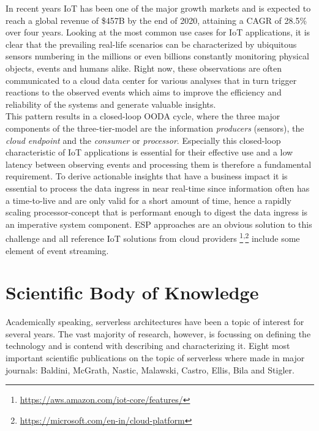 In recent years \acf{IoT} has been one of the major growth markets and is expected to reach a global revenue of \$457B by the end of 2020, attaining a \acf{CAGR} of 28.5\% over four years.\autocite{Columbus20172017Forecasts} Looking at the most common use cases for IoT applications, it is clear that the prevailing real-life scenarios can be characterized by ubiquitous sensors numbering in the millions or even billions constantly monitoring physical objects, events and humans alike. Right now, these observations are often communicated to a cloud data center for various analyses that in turn trigger reactions to the observed events which aims to improve the efficiency and reliability of the systems and generate valuable insights.\autocite{Yannuzzi2014KeyComputing} \\
This pattern results in a closed-loop \acf{OODA} cycle, where the three major components of the three-tier-model are the information \textit{producers} (sensors), the \textit{cloud endpoint} and the \textit{consumer} or \textit{processor}.\autocite{Shukla2017BenchmarkingApplications} Especially this closed-loop characteristic of IoT applications is essential for their effective use and a low latency between observing events and processing them is therefore a fundamental requirement. To derive actionable insights that have a business impact it is essential to process the data ingress in near real-time since information often has a time-to-live and are only valid for a short amount of time, hence a rapidly scaling processor-concept that is performant enough to digest the data ingress is an imperative system component. \acf{ESP} approaches are an obvious solution to this challenge and all reference IoT solutions from cloud providers \footnote{\url{https://aws.amazon.com/iot-core/features/}}\textsuperscript{,}\footnote{\url{https://microsoft.com/en-in/cloud-platform}} include some element of event streaming.


\section{Scientific Body of Knowledge}

Academically speaking, serverless architectures have been a topic of interest for several years. The vast majority of research, however, is focussing on defining the technology and is contend with describing and characterizing it. Eight most important scientific publications on the topic of serverless where made in major journals:  Baldini\autocite{Baldini2017TheComputing}, McGrath\autocite{McGrath2017ServerlessPerformance}, Nastic\autocite{Nastic2017AComputingb}, Malawski\autocite{Malawski2017ServerlessFunctions}, Castro\autocite{Castro2017ServerlessService}, Ellis\autocite{Ellis2017FunctionsDocker}, Bila\autocite{Bila2017LeveragingContainers} and Stigler\autocite{Stigler2018UnderstandingComputing}.\\

